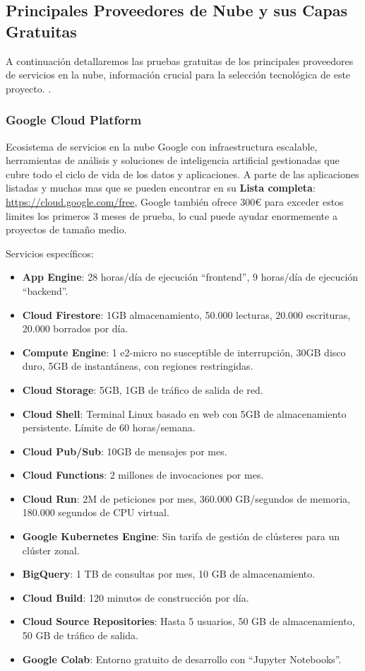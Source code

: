 \subsection{Principales Proveedores de Nube y sus Capas Gratuitas}
\label{sec:cloud-free-tiers}

A continuación detallaremos las pruebas gratuitas de los principales proveedores de servicios en la nube, información crucial para la selección tecnológica de este proyecto. \citep{free-for-dev}.

\subsubsection*{Google Cloud Platform}

Ecosistema de servicios en la nube Google con infraestructura escalable, herramientas de análisis y soluciones de inteligencia artificial gestionadas que cubre todo el ciclo de vida de los datos y aplicaciones. A parte de las aplicaciones listadas y muchas mas que se pueden encontrar en su \textbf{Lista completa}: \url{https://cloud.google.com/free}, Google también ofrece 300€ para exceder estos limites los primeros 3 meses de prueba, lo cual puede ayudar enormemente a proyectos de tamaño medio.

Servicios específicos:
\begin{itemize}
	\item \textbf{App Engine}: 28 horas/día de ejecución ``frontend'', 9 horas/día de ejecución ``backend''.
	\item \textbf{Cloud Firestore}: 1GB almacenamiento, 50.000 lecturas, 20.000 escrituras, 20.000 borrados por día.
	\item \textbf{Compute Engine}: 1 e2-micro no susceptible de interrupción, 30GB disco duro, 5GB de instantáneas, con regiones restringidas.
	\item \textbf{Cloud Storage}: 5GB, 1GB de tráfico de salida de red.
	\item \textbf{Cloud Shell}: Terminal Linux basado en web con 5GB de almacenamiento persistente. Límite de 60 horas/semana.
	\item \textbf{Cloud Pub/Sub}: 10GB de mensajes por mes.
	\item \textbf{Cloud Functions}: 2 millones de invocaciones por mes.
	\item \textbf{Cloud Run}: 2M de peticiones por mes, 360.000 GB/segundos de memoria, 180.000 segundos de CPU virtual.
	\item \textbf{Google Kubernetes Engine}: Sin tarifa de gestión de clústeres para un clúster zonal.
	\item \textbf{BigQuery}: 1 TB de consultas por mes, 10 GB de almacenamiento.
	\item \textbf{Cloud Build}: 120 minutos de construcción por día.
	\item \textbf{Cloud Source Repositories}: Hasta 5 usuarios, 50 GB de almacenamiento, 50 GB de tráfico de salida.
	\item \textbf{Google Colab}: Entorno gratuito de desarrollo con ``Jupyter Notebooks''.
\end{itemize}

